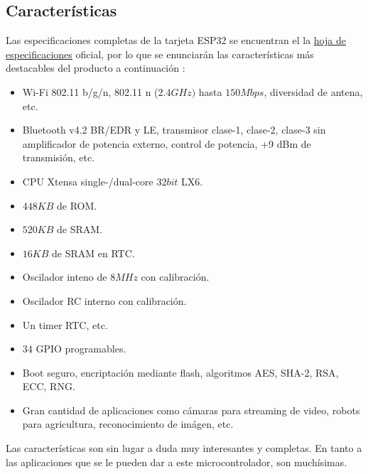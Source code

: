 \documentclass[conference]{IEEEtran}
\begin{document}
    \subsection{Características}

    Las especificaciones completas de la tarjeta ESP32 se encuentran el la \href{https://www.espressif.com/sites/default/files/documentation/esp32_datasheet_en.pdf}{hoja de especificaciones} oficial, por lo que se enunciarán las características más destacables del producto a continuación \cite{espressif-systems-shanghai-co-ltd-2022B}:

    \begin{itemize}
        \item Wi-Fi 802.11 b/g/n, 802.11 n ($2.4GHz)$ hasta $150Mbps$, diversidad de antena, etc.

        \item Bluetooth v4.2 BR/EDR y LE, transmisor clase-1, clase-2, clase-3 sin amplificador de potencia externo, control de potencia, +9 dBm de transmisión, etc.

        \item CPU Xtensa single-/dual-core $32 bit$ LX6.

        \item $448 KB$ de ROM.

        \item $520 KB$ de SRAM.

        \item $16 KB$ de SRAM en RTC.

        \item Oscilador inteno de $8 MHz$ con calibración.

        \item Oscilador RC interno con calibración.

        \item Un timer RTC, etc.

        \item $34$ GPIO programables.

        \item Boot seguro, encriptación mediante flash, algoritmos AES, SHA-2, RSA, ECC, RNG.

        \item Gran cantidad de aplicaciones como cámaras para streaming de video, robots para agricultura, reconocimiento de imágen, etc.
    \end{itemize}

    Las características son sin lugar a duda muy interesantes y completas. En tanto a las aplicaciones que se le pueden dar a este microcontrolador, son muchísimas.
\end{document}
